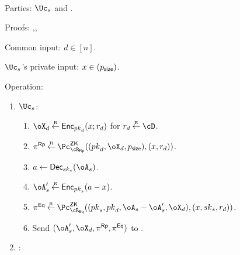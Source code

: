 \begin{protocol}~\label{prot:ConfidentialTransactions:Transfer}
	\item[Parties:] $\Uc_s$ and \Cc.
	
\item[Proofs:]   \piZK{\rRp},\piZK{\rEq},\piZK{\rLrgEq}



	
	\item[Common input:] $d\in [n]$.
	
	\item[$\Uc_s$'s private  input:] $x \in (p_{\mathsf{size}})$.
	
\item[Operation:] ~
	
	\begin{enumerate}
		\item  $\Uc_s$: 
		
		\begin{enumerate}
			\item $\oX_d \getsr \Enc_{\pk_d}(x;r_d)$ for $r_d \getsr \cD$.
			
		
			\item $\pi^\RPs \getsr \pZK{\rRp}((\pk_d,\oX_d,\psize),(x,r_d))$.
			
			
			
			
			\item $a \asn \Dec_{\sk_s}(\oA_s)$.
			
			\item $\oA_s' \getsr \Enc_{\pk_s}(a-x)$.
			
			
		 

			
			
			\item $\pi^\Eqs \getsr \pZK{\rEq}((\pk_s,\pk_d,\oA_s- \oA_s',\oX_d),(x,\sk_s,r_d))$.
			
			
		
			
			
			
			\item Send $(\oA_s',\oX_d,\pi^\RPs,\pi^\Eqs)$ to \Cc.
		\end{enumerate}
		
		
		\item  \Cc: 
		
		\begin{enumerate}
			

\end{enumerate}
\end{enumerate}
\end{protocol}
